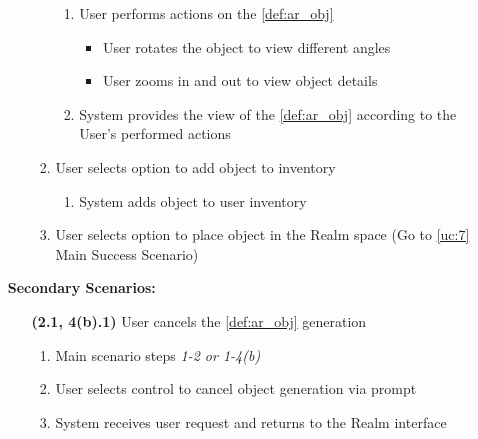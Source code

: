\documentclass{article}
\begin{document}
\begin{enumerate}[label=\textbf{UC\arabic*}]
\begin{enumerate}[label=\textbf{\arabic*.}]
\begin{enumerate}[label=(\alph*)]
\begin{enumerate}
                                  \item User performs actions on the \ref{def:ar_obj}
                                        \begin{itemize}
                                            \item User rotates the object to view different angles
                                            \item User zooms in and out to view object details
                                        \end{itemize}
                                  \item System provides the view of the \ref{def:ar_obj} according to the User's performed actions
                              \end{enumerate}
                        \item User selects option to add object to inventory
                              \begin{enumerate}
                                  \item System adds object to user inventory
                              \end{enumerate}
                        \item User selects option to place object in the Realm space (Go to \ref{uc:7} Main Success Scenario)
                    \end{enumerate}
          \end{enumerate}

          \textbf{Secondary Scenarios:}
          \begin{itemize}
              \item[\textbf{(2.1, 4(b).1)}] User cancels the \ref{def:ar_obj} generation
                    \begin{enumerate}[label=\textbf{\arabic*.}]
                        \item Main scenario steps \textit{1-2 or 1-4(b)}
                        \item User selects control to cancel object generation via prompt
                        \item System receives user request and returns to the Realm interface
                    \end{enumerate}


\end{itemize}
\end{enumerate}
\end{document}
